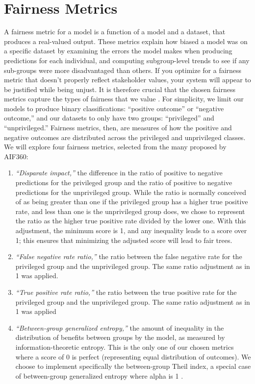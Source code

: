 \documentclass[twoside]{article}
\begin{document}
\section{Fairness Metrics}
A fairness metric for a model is a function of a model and a dataset, that produces a real-valued output. These metrics explain how biased a model was on a specific dataset by examining the errors the model makes when producing predictions for each individual, and computing subgroup-level trends to see if any sub-groups were more disadvantaged than others. If you optimize for a fairness metric that doesn’t properly reflect stakeholder values, your system will appear to be justified while being unjust. It is therefore crucial that the chosen fairness metrics capture the types of fairness that we value \citep{Binns:2017}. For simplicity, we limit our models to produce binary classifications: “positive outcome” or “negative outcome,” and our datasets to only have two groups: “privileged” and “unprivileged.” Fairness metrics, then, are measures of how the positive and negative outcomes are distributed across the privileged and unprivileged classes. We will explore four fairness metrics, selected from the many proposed by AIF360:

\begin{enumerate}
\item
\textit{“Disparate impact,”} the difference in the ratio of positive to negative predictions for the privileged group and the ratio of positive to negative predictions for the unprivileged group. While the ratio is normally conceived of as being greater than one if the privileged group has a higher true positive rate, and less than one is the unprivileged group does, we chose to represent the ratio as the higher true positive rate divided by the lower one. With this adjustment, the minimum score is 1, and any inequality leads to a score over 1; this ensures that minimizing the adjusted score will lead to fair trees.
\item 
\textit{“False negative rate ratio,”} the ratio between the false negative rate for the privileged group and the unprivileged group. The same ratio adjustment as in 1 was applied.
\item 
\textit{“True positive rate ratio,”} the ratio between the true positive rate for the privileged group and the unprivileged group. The same ratio adjustment as in 1 was applied
\item 
\textit{“Between-group generalized entropy,”} the amount of inequality in the distribution of benefits between groups by the model, as measured by information-theoretic entropy. This is the only one of our chosen metrics where a score of 0 is perfect (representing equal distribution of outcomes). We choose to implement specifically the between-group Theil index, a special case of between-group generalized entropy where alpha is 1 \citep{Speicher:2018}.
\end{enumerate}
\end{document}
